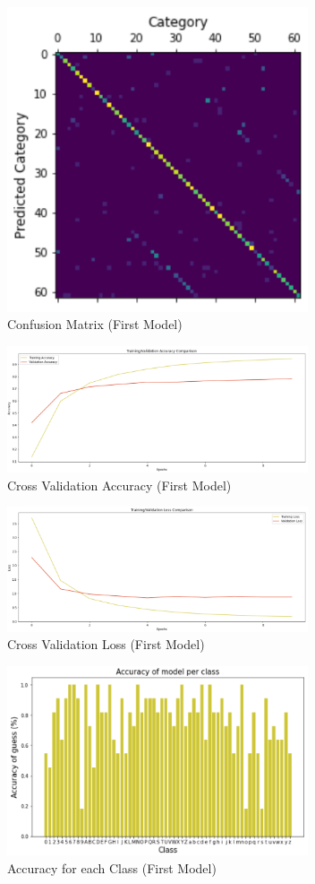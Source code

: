 \documentclass[conference]{IEEEtran}
\begin{document}
\begin{figure}[H]
    \centering
    \includegraphics[width=3.5in]{pictures/model1_confmatrix.png}
    \caption{Confusion Matrix (First Model)}\label{fig:example4}
\end{figure}

\begin{figure}[H]
    \centering
    \includegraphics[width=3.5in]{pictures/model1_accuracy.png}
    \caption{Cross Validation Accuracy (First Model)}\label{fig:example4}
\end{figure}

\begin{figure}[H]
    \centering
    \includegraphics[width=3.5in]{pictures/model1_loss.png}
    \caption{Cross Validation Loss (First Model)}\label{fig:example4}
\end{figure}

\begin{figure}[H]
    \centering
    \includegraphics[width=3.5in]{pictures/model1_acc_class.png}
    \caption{Accuracy for each Class (First Model)}\label{fig:example4}
\end{figure}
\end{document}
